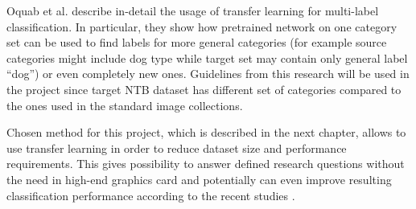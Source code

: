 Oquab et al. describe in-detail the usage of transfer learning for multi-label classification. In particular, they show how pretrained network on one category set can be used to find labels for more general categories (for example source categories might include dog type while target set may contain only general label ``dog'') or even completely new ones. \cite{Oquab2014TransferringMidLevel} Guidelines from this research will be used in the project since target NTB dataset has different set of categories compared to the ones used in the standard image collections.

Chosen method for this project, which is described in the next chapter, allows to use transfer learning in order to reduce dataset size and performance requirements. This gives possibility to answer defined research questions without the need in high-end graphics card and potentially can even improve resulting classification performance according to the recent studies \cite{Yosinski2014HowTransferable, Oquab2014TransferringMidLevel}.